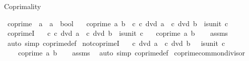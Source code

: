 \begin{isabellebody}
\endisatagproof
{\isafoldproof}%
%
\isadelimproof
%
\endisadelimproof
%
\begin{isamarkuptext}%
Coprimality%
\end{isamarkuptext}\isamarkuptrue%
\isamarkupfalse%
\ coprime\ {\isacharcolon}{\kern0pt}{\isacharcolon}{\kern0pt}\ {\isachardoublequoteopen}{\isacharprime}{\kern0pt}a\ {\isasymRightarrow}\ {\isacharprime}{\kern0pt}a\ {\isasymRightarrow}\ bool{\isachardoublequoteclose}\isanewline
\ \ \ {\isachardoublequoteopen}coprime\ a\ b\ {\isasymlongleftrightarrow}\ {\isacharparenleft}{\kern0pt}{\isasymforall}c{\isachardot}{\kern0pt}\ c\ dvd\ a\ {\isasymlongrightarrow}\ c\ dvd\ b\ {\isasymlongrightarrow}\ is{\isacharunderscore}{\kern0pt}unit\ c{\isacharparenright}{\kern0pt}{\isachardoublequoteclose}\isanewline
\isanewline
{}\isamarkupfalse%
\ coprimeI{\isacharcolon}{\kern0pt}\isanewline
\ \ \ {\isachardoublequoteopen}{\isasymAnd}c{\isachardot}{\kern0pt}\ c\ dvd\ a\ {\isasymLongrightarrow}\ c\ dvd\ b\ {\isasymLongrightarrow}\ is{\isacharunderscore}{\kern0pt}unit\ c{\isachardoublequoteclose}\isanewline
\ \ \ {\isachardoublequoteopen}coprime\ a\ b{\isachardoublequoteclose}\isanewline
%
\isadelimproof
\ \ %
\endisadelimproof
%
\isatagproof
{}\isamarkupfalse%
\ assms\ \isamarkupfalse%
\ {\isacharparenleft}{\kern0pt}auto\ simp{\isacharcolon}{\kern0pt}\ coprime{\isacharunderscore}{\kern0pt}def{\isacharparenright}{\kern0pt}%
\endisatagproof
{\isafoldproof}%
%
\isadelimproof
\isanewline
%
\endisadelimproof
\isanewline
{}\isamarkupfalse%
\ not{\isacharunderscore}{\kern0pt}coprimeI{\isacharcolon}{\kern0pt}\isanewline
\ \ \ {\isachardoublequoteopen}c\ dvd\ a{\isachardoublequoteclose}\ \ {\isachardoublequoteopen}c\ dvd\ b{\isachardoublequoteclose}\ \ {\isachardoublequoteopen}{\isasymnot}\ is{\isacharunderscore}{\kern0pt}unit\ c{\isachardoublequoteclose}\isanewline
\ \ \ {\isachardoublequoteopen}{\isasymnot}\ coprime\ a\ b{\isachardoublequoteclose}\isanewline
%
\isadelimproof
\ \ %
\endisadelimproof
%
\isatagproof
{}\isamarkupfalse%
\ assms\ \isamarkupfalse%
\ {\isacharparenleft}{\kern0pt}auto\ simp{\isacharcolon}{\kern0pt}\ coprime{\isacharunderscore}{\kern0pt}def{\isacharparenright}{\kern0pt}%
\endisatagproof
{\isafoldproof}%
%
\isadelimproof
\isanewline
%
\endisadelimproof
\isanewline
{}\isamarkupfalse%
\ coprime{\isacharunderscore}{\kern0pt}common{\isacharunderscore}{\kern0pt}divisor{\isacharcolon}{\kern0pt}\isanewline

\end{isabellebody}
